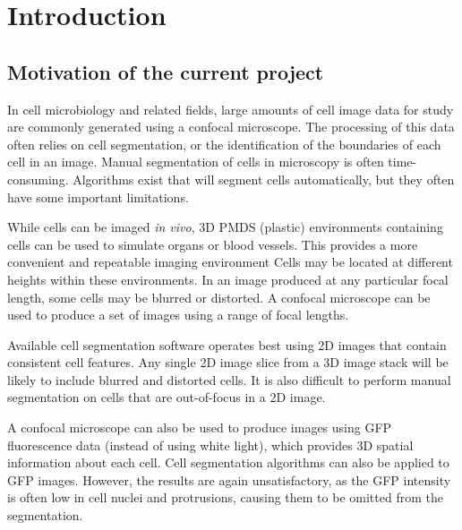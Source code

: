 
\chapter{Introduction}  %

\ifpdf
    \graphicspath{{Chapter1/Figs/Raster/}{Chapter1/Figs/PDF/}{Chapter1/Figs/}}
\else
    \graphicspath{{Chapter1/Figs/Vector/}{Chapter1/Figs/}}
\fi

\section{Motivation of the current project} %
\label{section1.1}

In cell microbiology and related fields, large amounts of cell image data for study are commonly generated using a confocal microscope. The processing of this data often relies on cell segmentation, or the identification of the boundaries of each cell in an image.  Manual segmentation of cells in microscopy is often time-consuming. Algorithms exist that will segment cells automatically, but they often have some important limitations.

While cells can be imaged \emph{in vivo}, 3D PMDS (plastic) environments containing cells can be used to simulate organs or blood vessels.  This provides a more convenient and repeatable imaging environment Cells may be located at different heights within these environments. In an image produced at any particular focal length, some cells may be blurred or distorted. A confocal microscope can be used to produce a set of images using a range of focal lengths. 

Available cell segmentation software operates best using 2D images that contain consistent cell features. Any single 2D image slice from a 3D image stack will be likely to include blurred and distorted cells. It is also difficult to perform manual segmentation on cells that are out-of-focus in a 2D image.

A confocal microscope can also be used to produce images using GFP fluorescence data (instead of using white light), which provides 3D spatial information about each cell.  Cell segmentation algorithms can also be applied to GFP images. However, the results are again unsatisfactory, as the GFP intensity is often low in cell nuclei and protrusions, causing them to be omitted from the segmentation.

